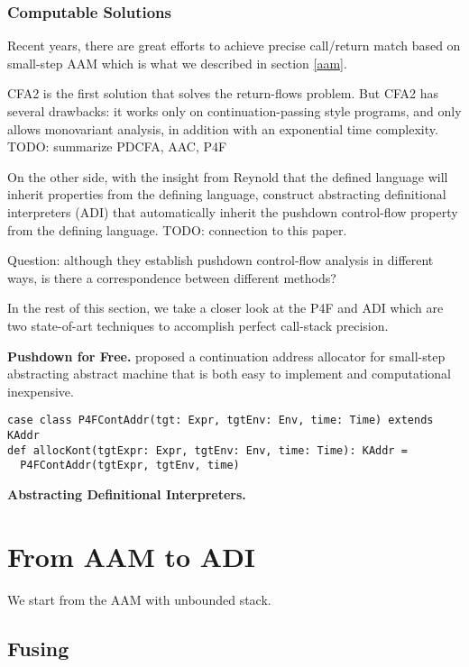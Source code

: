 \documentclass[acmsmall,review,anonymous]{acmart}\settopmatter{printfolios=true,printccs=false,printacmref=false}
\begin{document}
\subsubsection{Computable Solutions}

Recent years, there are great efforts \cite{vardoulakis2010cfa2, earl2012introspective, 
gilray2016pushdown, johnson2015abstracting} to achieve precise call/return 
match based on small-step AAM which is what we described in section \ref{aam}.

CFA2 is the first solution that solves the return-flows problem\cite{vardoulakis2010cfa2}.
But CFA2 has several drawbacks: it works only on continuation-passing style programs, 
and only allows monovariant analysis, in addition with an exponential time complexity.
TODO: summarize PDCFA, AAC, P4F

On the other side, with the insight from Reynold that the defined language will inherit properties
from the defining language, \citeauthor{darais2017abstracting} construct abstracting 
definitional interpreters (ADI) that automatically inherit the pushdown control-flow 
property from the defining language.
TODO: connection to this paper.

Question: although they establish pushdown control-flow analysis in different ways, 
is there a correspondence between different methods?

In the rest of this section, we take a closer look at the P4F and ADI which are
two state-of-art techniques to accomplish perfect call-stack precision.

\textbf{Pushdown for Free.}
\citeauthor{gilray2016pushdown} proposed a continuation address allocator for 
small-step abstracting abstract machine that is both easy to implement and
computational inexpensive.

\begin{verbatim}
case class P4FContAddr(tgt: Expr, tgtEnv: Env, time: Time) extends KAddr
def allocKont(tgtExpr: Expr, tgtEnv: Env, time: Time): KAddr = 
  P4FContAddr(tgtExpr, tgtEnv, time)
\end{verbatim}

\textbf{Abstracting Definitional Interpreters.}

\section{From AAM to ADI}

We start from the AAM with unbounded stack.

\subsection{Fusing}
\end{document}

